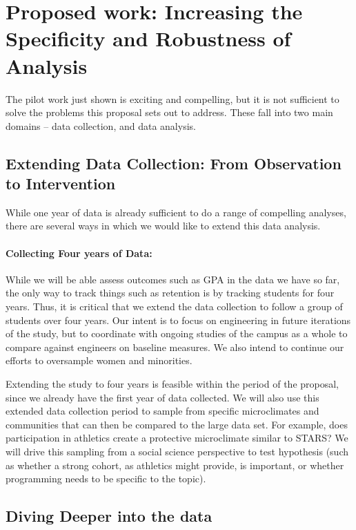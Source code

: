 \section{Proposed work: Increasing the Specificity and Robustness of Analysis}
The pilot work just shown is exciting and compelling, but it is not sufficient to solve the problems this proposal sets out to address. These fall into two main domains -- data collection, and data analysis.

\subsection{Extending Data Collection: From Observation to Intervention}
While one year of data is already sufficient to do a range of compelling analyses, there are several ways in which we would like to extend this data analysis.

\paragraph{Collecting Four years of Data:} While we will be able assess outcomes such as GPA in the data we have so far, the only way to track things such as retention is by tracking students for four years. Thus, it is critical that we extend the data collection to follow a group of students over four years. Our intent is to focus on engineering in future iterations of the study, but to coordinate with ongoing studies of the campus as a whole to compare against engineers on baseline measures. We also intend to continue our efforts to oversample women and minorities.  

Extending the study to four years is feasible within the period of the proposal, since we already have the first year of data collected. We will also use this extended data collection period to sample from specific microclimates and communities that can then be compared to the large data set. For example, does participation in athletics create a protective microclimate similar to STARS? We will drive this sampling from a social science perspective to test hypothesis (such as whether a strong cohort, as athletics might provide, is important, or whether programming needs to be specific to the topic). 

\subsection{Diving Deeper into the data}
